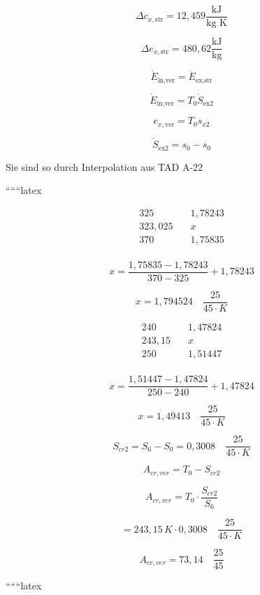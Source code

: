 \[
\Delta c_{x,\text{str}} = 12,459 \frac{\text{kJ}}{\text{kg K}}
\]

\[
\Delta e_{x,\text{str}} = 480,62 \frac{\text{kJ}}{\text{kg}}
\]

\[
\dot{E}_{\text{in,ver}} = \dot{E}_{\text{ex,str}}
\]

\[
\dot{E}_{\text{in,ver}} = T_0 \dot{S}_{\text{ex2}}
\]

\[
e_{x,\text{ver}} = T_0 s_{x2}
\]

\[
\dot{S}_{\text{ex2}} = s_0 - s_0
\]

Sie sind so durch Interpolation aus TAD A-22

``````latex


\begin{align*}
325 & \quad 1,78243 \\
323,025 & \quad x \\
370 & \quad 1,75835 \\
\end{align*}

\[
x = \frac{1,75835 - 1,78243}{370 - 325} + 1,78243
\]

\[
x = 1,794524 \quad \frac{25}{45 \cdot K}
\]

\begin{align*}
240 & \quad 1,47824 \\
243,15 & \quad x \\
250 & \quad 1,51447 \\
\end{align*}

\[
x = \frac{1,51447 - 1,47824}{250 - 240} + 1,47824
\]

\[
x = 1,49413 \quad \frac{25}{45 \cdot K}
\]

\[
S_{cr2} = S_6 - S_0 = 0,3008 \quad \frac{25}{45 \cdot K}
\]

\[
A_{cr,ver} = T_0 - S_{cr2}
\]

\[
A_{cr,ver} = T_0 \cdot \frac{S_{cr2}}{S_6}
\]

\[
= 243,15 \, K \cdot 0,3008 \quad \frac{25}{45 \cdot K}
\]

\[
A_{cr,ver} = 73,14 \quad \frac{25}{45}
\]

``````latex